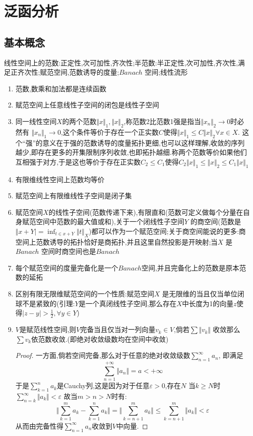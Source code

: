 \chapter{泛函分析}
\section{基本概念}

线性空间上的范数:正定性,次可加性,齐次性;半范数:半正定性,次可加性,齐次性,满足正齐次性;赋范空间,范数诱导的度量;$Banach$ 空间;线性流形

\begin{enumerate}
\item 范数,数乘和加法都是连续函数
\item 赋范空间上任意线性子空间的闭包是线性子空间
\item 同一线性空间$X$的两个范数$\Vert x\Vert_1,\Vert x\Vert_2$,称范数2比范数1强是指当$\Vert x_n\Vert_2\to0$时必然有
$\Vert x_n\Vert_1\to0$,这个条件等价于存在一个正实数$C$使得$\Vert x\Vert_1\le C\Vert x\Vert_2\forall x\in X$.
这个“强”的意义在于强的范数诱导的度量拓扑更细,也可以这样理解,收敛的序列越少,即存在更多的开集限制序列收敛,也即拓扑越细.称两个范数等价如果他们互相强于对方,于是这也等价于存在正实数$C_2\le C_1$使得$C_2\Vert x\Vert_1\le\Vert x\Vert_2\le C_1\Vert x\Vert_1$
\item 有限维线性空间上范数均等价
\item 赋范空间上有限维线性子空间是闭子集
\item 赋范空间$X$的线性子空间(范数传递下来),有限直和(范数可定义做每个分量在自身赋范空间中范数的最大值或和),关于一个闭线性子空间$Y$ 的商空间(范数是$\Vert x+Y\vert=\inf_{t\in x+Y}\Vert t\Vert_X$)都可以作为一个赋范空间;关于商空间能说的更多:商空间上范数诱导的拓扑恰好是商拓扑,并且这里自然投影是开映射;当$X$ 是$Banach$ 空间时商空间也是$Banach$
\item 每个赋范空间的度量完备化是一个$Banach$空间,并且完备化上的范数是原本范数的延拓
\item 区别有限无限维赋范空间的一个性质:赋范空间$X$ 是无限维的当且仅当单位闭球不是紧致的(引理:$Y$是一个真闭线性子空间,那么存在$X$中长度为1的向量$z$使得$\mid z-y\mid>\frac{1}{2},\forall y\in Y$)
\item $V$是赋范线性空间,则$V$完备当且仅当对一列向量$v_k\in V$,倘若$\sum\Vert v_k\Vert$ 收敛那么$\sum v_k$依范数收敛.(即绝对收敛级数均在空间中收敛)
    \begin{proof}
  一方面,倘若空间完备,那么对于任意的绝对收敛级数$\sum_ {n=1}^{\infty}a_n$, 即满足$$\sum_{n=1}^{+\infty}\Vert a_n\Vert=a<+\infty$$
  于是$\sum_{k=1}^n a_k$是Cauchy列,这是因为对于任意$\varepsilon>0$,存在$N$ 当$k\ge N$时$\sum_{n=k}^{\infty}\Vert a_k\Vert<\varepsilon$
  故当$m>n>N$时有:$$\Vert\sum_{k=1}^m a_k-\sum_{k=1}^n a_k\Vert=\Vert\sum_{k=n+1}^m a_k\Vert\le\sum_{k=n+1}^m\Vert a_k\Vert<\varepsilon$$
  从而由完备性得$\sum_{n=1}^{\infty}a_n$收敛到$V$中向量.


\end{proof}
\end{enumerate}

